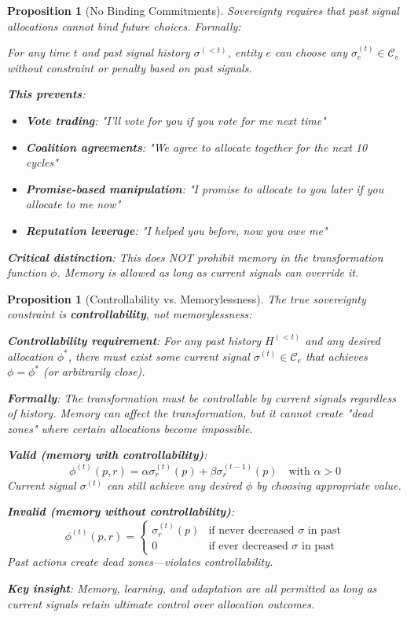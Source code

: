 \documentclass[11pt,a4paper]{article}
\newtheorem{proposition}[theorem]{Proposition}
\theoremstyle{definition}
\theoremstyle{remark}
\newcommand{\C}{\mathcal{C}}
\begin{document}
\begin{proposition}[No Binding Commitments]
\label{prop:no-binding-commitments}
Sovereignty requires that past signal allocations cannot bind future choices. Formally:

For any time $t$ and past signal history $\sigma^{(<t)}$, entity $e$ can choose any $\sigma_e^{(t)} \in \C_e$ without constraint or penalty based on past signals.

\textbf{This prevents}:
\begin{itemize}
\item \textbf{Vote trading}: "I'll vote for you if you vote for me next time"
\item \textbf{Coalition agreements}: "We agree to allocate together for the next 10 cycles"
\item \textbf{Promise-based manipulation}: "I promise to allocate to you later if you allocate to me now"
\item \textbf{Reputation leverage}: "I helped you before, now you owe me"
\end{itemize}

\textbf{Critical distinction}: This does NOT prohibit memory in the transformation function $\phi$. Memory is allowed as long as current signals can override it.
\end{proposition}

\begin{proposition}[Controllability vs. Memorylessness]
\label{prop:controllability}
The true sovereignty constraint is \textbf{controllability}, not memorylessness:

\textbf{Controllability requirement}: For any past history $H^{(<t)}$ and any desired allocation $\phi^*$, there must exist some current signal $\sigma^{(t)} \in \C_e$ that achieves $\phi = \phi^*$ (or arbitrarily close).

\textbf{Formally}: The transformation must be controllable by current signals regardless of history. Memory can affect the transformation, but it cannot create "dead zones" where certain allocations become impossible.

\textbf{Valid (memory with controllability)}:
\[ \phi^{(t)}(p,r) = \alpha \sigma_r^{(t)}(p) + \beta \sigma_r^{(t-1)}(p) \quad \text{with } \alpha > 0 \]
Current signal $\sigma^{(t)}$ can still achieve any desired $\phi$ by choosing appropriate value.

\textbf{Invalid (memory without controllability)}:
\[ \phi^{(t)}(p,r) = \begin{cases} 
\sigma_r^{(t)}(p) & \text{if never decreased } \sigma \text{ in past} \\
0 & \text{if ever decreased } \sigma \text{ in past}
\end{cases} \]
Past actions create dead zones—violates controllability.

\textbf{Key insight}: Memory, learning, and adaptation are all permitted as long as current signals retain ultimate control over allocation outcomes.
\end{proposition}
\end{document}
